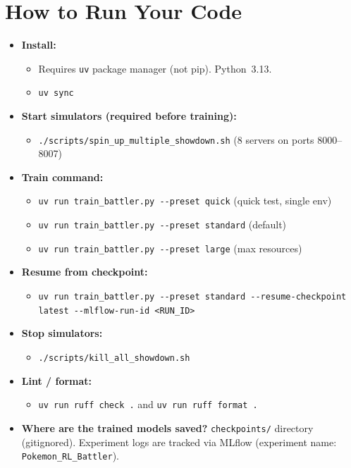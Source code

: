 \documentclass[11pt, a4paper]{article}
\begin{document}
\section{How to Run Your Code}
\begin{itemize}
    \item \textbf{Install:}
        \begin{itemize}
            \item Requires \texttt{uv} package manager (not pip). Python~3.13.
            \item \texttt{uv sync}
        \end{itemize}

    \item \textbf{Start simulators (required before training):}
        \begin{itemize}
            \item \texttt{./scripts/spin\_up\_multiple\_showdown.sh} \quad (8 servers on ports 8000--8007)
        \end{itemize}

    \item \textbf{Train command:}
        \begin{itemize}
            \item \texttt{uv run train\_battler.py -{}-preset quick} \quad (quick test, single env)
            \item \texttt{uv run train\_battler.py -{}-preset standard} \quad (default)
            \item \texttt{uv run train\_battler.py -{}-preset large} \quad (max resources)
        \end{itemize}

    \item \textbf{Resume from checkpoint:}
        \begin{itemize}
            \item \texttt{uv run train\_battler.py -{}-preset standard -{}-resume-checkpoint latest -{}-mlflow-run-id <RUN\_ID>}
        \end{itemize}

    \item \textbf{Stop simulators:}
        \begin{itemize}
            \item \texttt{./scripts/kill\_all\_showdown.sh}
        \end{itemize}

    \item \textbf{Lint / format:}
        \begin{itemize}
            \item \texttt{uv run ruff check .} \quad and \quad \texttt{uv run ruff format .}
        \end{itemize}

    \item \textbf{Where are the trained models saved?}
        \texttt{checkpoints/} directory (gitignored). Experiment logs are tracked via MLflow (experiment name: \texttt{Pokemon\_RL\_Battler}).
\end{itemize}
\end{document}
